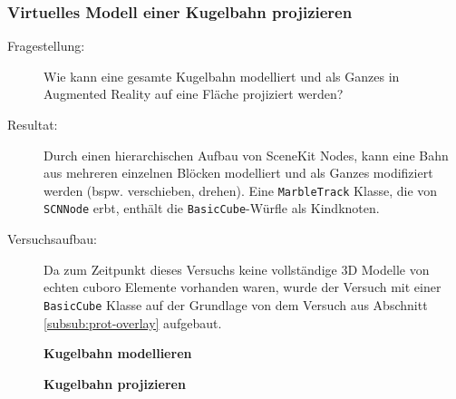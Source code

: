 \subsubsection{Virtuelles Modell einer Kugelbahn projizieren}
\begin{description}
	\item[Fragestellung:] Wie kann eine gesamte Kugelbahn modelliert und als Ganzes in Augmented Reality auf eine Fläche projiziert werden?
	\item[Resultat:] Durch einen hierarchischen Aufbau von SceneKit Nodes, kann eine Bahn aus mehreren einzelnen Blöcken modelliert und als Ganzes modifiziert werden (bspw. verschieben, drehen). Eine \texttt{MarbleTrack} Klasse, die von \texttt{SCNNode} erbt, enthält die \texttt{BasicCube}-Würfle als Kindknoten. %
	\item[Versuchsaufbau:] Da zum Zeitpunkt dieses Versuchs keine vollständige 3D Modelle von echten cuboro Elemente vorhanden waren, wurde der Versuch mit einer \texttt{BasicCube} Klasse auf der Grundlage von dem Versuch aus Abschnitt \ref{subsub:prot-overlay} aufgebaut.

	\textbf{Kugelbahn modellieren}

	\textbf{Kugelbahn projizieren}

\end{description}
